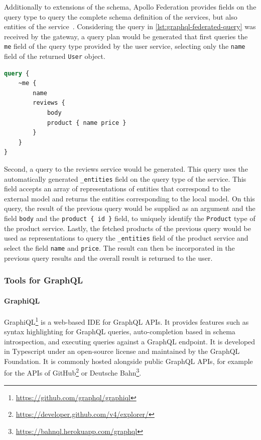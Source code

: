 Additionally to extensions of the schema, Apollo Federation provides fields on the query type to query the complete schema definition of the services, but also entities of the service~\cite{MDGa}.
Considering the query in \autoref{lst:graphql-federated-query} was received by the gateway, a query plan would be generated that first queries the \texttt{me} field of the query type provided by the user service, selecting only the \texttt{name} field of the returned \texttt{User} object.

\begin{lstlisting}[caption={Query to a Federated GraphQL \acs{API}~\cite{MDG}}, language=graphql, label={lst:graphql-federated-query}]
query {
    ~me {
        name
        reviews {
            body
            product { name price }
        }
    }
}
\end{lstlisting}

Second, a query to the reviews service would be generated.
This query uses the automatically generated \texttt{\_entities} field on the query type of the service.
This field accepts an array of representations of entities that correspond to the external model and returns the entities corresponding to the local model.
On this query, the result of the previous query would be supplied as an argument and the field \texttt{body} and the \texttt{product \{ id \}} field, to uniquely identify the \texttt{Product} type of the product service.
Lastly, the fetched products of the previous query would be used as representations to query the \texttt{\_entities} field of the product service and select the field \texttt{name} and \texttt{price}.
The result can then be incorporated in the previous query results and the overall result is returned to the user.

\subsubsection{Tools for GraphQL}\label{sec:graphql-tools}


\paragraph{GraphiQL}

GraphiQL\footnote{\url{https://github.com/graphql/graphiql}} is a web-based \ac{IDE} for GraphQL \acp{API}.
It provides features such as syntax highlighting for GraphQL queries, auto-completion based in schema introspection, and executing queries against a GraphQL endpoint.
It is developed in Typescript under an open-source license and maintained by the GraphQL Foundation.
It is commonly hosted alongside public GraphQL \acp{API}, for example for the \acp{API} of GitHub\footnote{\url{https://developer.github.com/v4/explorer/}} or Deutsche Bahn\footnote{\url{https://bahnql.herokuapp.com/graphql}}.


